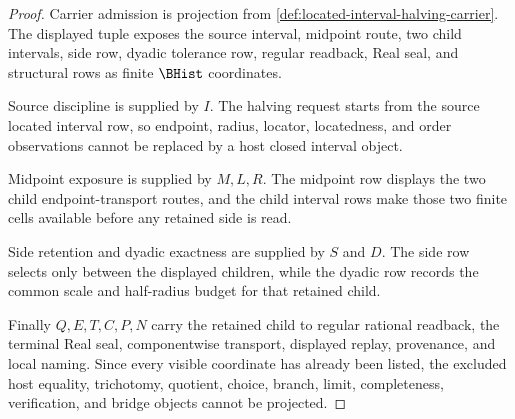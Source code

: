 \begin{proof}
Carrier admission is projection from \autoref{def:located-interval-halving-carrier}. The displayed tuple exposes the source interval, midpoint route, two child intervals, side row, dyadic tolerance row, regular readback, Real seal, and structural rows as finite $\BHist$ coordinates.

Source discipline is supplied by $I$. The halving request starts from the source located interval row, so endpoint, radius, locator, locatedness, and order observations cannot be replaced by a host closed interval object.

Midpoint exposure is supplied by $M,L,R$. The midpoint row displays the two child endpoint-transport routes, and the child interval rows make those two finite cells available before any retained side is read.

Side retention and dyadic exactness are supplied by $S$ and $D$. The side row selects only between the displayed children, while the dyadic row records the common scale and half-radius budget for that retained child.

Finally $Q,E,T,C,P,N$ carry the retained child to regular rational readback, the terminal Real seal, componentwise transport, displayed replay, provenance, and local naming. Since every visible coordinate has already been listed, the excluded host equality, trichotomy, quotient, choice, branch, limit, completeness, verification, and bridge objects cannot be projected.
\end{proof}


